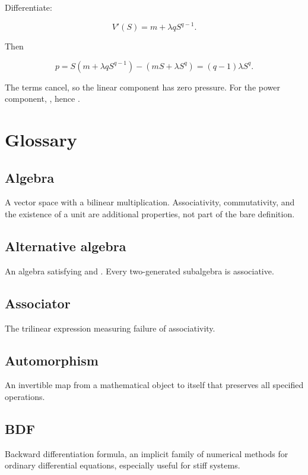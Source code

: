 \documentclass[11pt]{article}
\begin{document}
Differentiate:

\[
V'(S)=m+\lambda qS^{q-1}.
\]

Then

\[
p=S(m+\lambda qS^{q-1})-(mS+\lambda S^q)
=(q-1)\lambda S^q.
\]

The \texttt{} terms cancel, so the linear component has zero pressure. For the power component, \texttt{}, hence \texttt{}.

\section{Glossary}

\subsection{Algebra}

A vector space with a bilinear multiplication. Associativity, commutativity, and the existence of a unit are additional properties, not part of the bare definition.

\subsection{Alternative algebra}

An algebra satisfying \texttt{} and \texttt{}. Every two-generated subalgebra is associative.

\subsection{Associator}

The trilinear expression \texttt{} measuring failure of associativity.

\subsection{Automorphism}

An invertible map from a mathematical object to itself that preserves all specified operations.

\subsection{BDF}

Backward differentiation formula, an implicit family of numerical methods for ordinary differential equations, especially useful for stiff systems.
\end{document}
